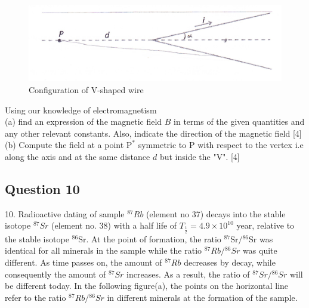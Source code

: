 \documentclass{article}
\begin{document}
\begin{figure}
	\centering
	\includegraphics[width=0.5\linewidth]{spho_book_TYS_images/2014q9.png}
	\caption{Configuration of V-shaped wire}
\end{figure}

Using our knowledge of electromagnetism \\
(a) find an expression of the magnetic field $B$ in terms of the given quantities and any other relevant constants. Also, indicate the direction of the magnetic field [4] \\
(b) Compute the field at a point $\mathrm{P}^{*}$ symmetric to $\mathrm{P}$ with respect to the vertex i.e along the axis and at the same distance $d$ but inside the "V". [4] \\

\subsection{Question 10}
10. Radioactive dating of sample ${ }^{87} R b$ (element no 37) decays into the stable isotope ${ }^{87} S r$ (element no. 38) with a half life of $T_{\frac{1}{2}}=4.9 \times 10^{10}$ year, relative to the stable isotope ${ }^{86} \mathrm{Sr} .$ At the point of formation, the ratio ${ }^{87} \mathrm{Sr} /{ }^{86} \mathrm{Sr}$ was identical for all minerals in the sample while the ratio ${ }^{87} R b /{ }^{86} S r$ was quite different. As time passes on, the amount of ${ }^{87} R b$ decreases by decay, while consequently the amount of ${ }^{87} S r$ increases. As a result, the ratio of ${ }^{87} S r /{ }^{86} S r$ will be different today. In the following figure(a), the points on the horizontal line refer to the ratio ${ }^{87} R b /{ }^{86} S r$ in different minerals at the formation of the sample.
\end{document}

